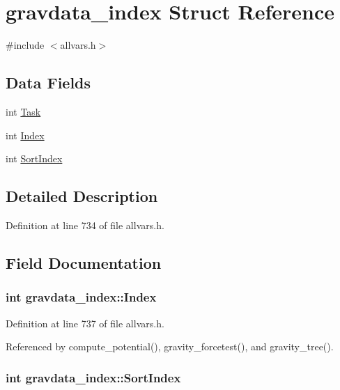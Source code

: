 \hypertarget{structgravdata__index}{
\section{gravdata\_\-index Struct Reference}
\label{structgravdata__index}
}


{\ttfamily \#include $<$allvars.h$>$}

\subsection*{Data Fields}
\begin{DoxyCompactItemize}
\item 
int \hyperlink{structgravdata__index_afacf7009bcd9677cf8ddff3dc927d6c5}{Task}
\item 
int \hyperlink{structgravdata__index_aac6e682d48cdd924a09384b4551b678e}{Index}
\item 
int \hyperlink{structgravdata__index_a34600f886624e73eb38845cb5d51d04c}{SortIndex}
\end{DoxyCompactItemize}


\subsection{Detailed Description}


Definition at line 734 of file allvars.h.



\subsection{Field Documentation}
\hypertarget{structgravdata__index_aac6e682d48cdd924a09384b4551b678e}{
\subsubsection[{Index}]{\setlength{\rightskip}{0pt plus 5cm}int {\bf gravdata\_\-index::Index}}}
\label{structgravdata__index_aac6e682d48cdd924a09384b4551b678e}


Definition at line 737 of file allvars.h.



Referenced by compute\_\-potential(), gravity\_\-forcetest(), and gravity\_\-tree().

\hypertarget{structgravdata__index_a34600f886624e73eb38845cb5d51d04c}{
\subsubsection[{SortIndex}]{\setlength{\rightskip}{0pt plus 5cm}int {\bf gravdata\_\-index::SortIndex}}}
\label{structgravdata__index_a34600f886624e73eb38845cb5d51d04c}


